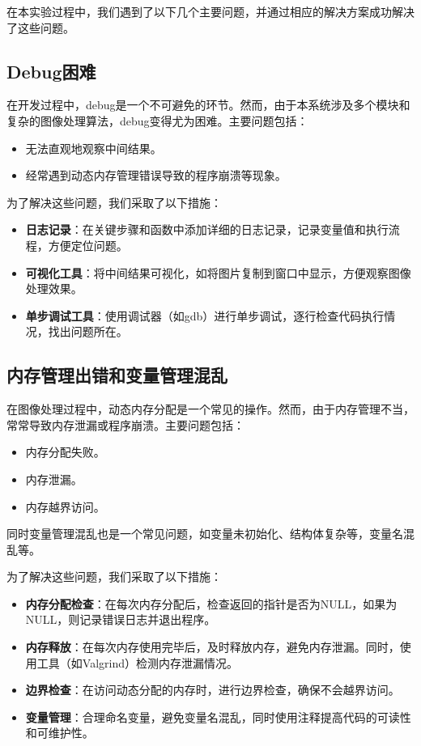 \documentclass[12pt,hyperref,a4paper,UTF8]{ctexart}
\begin{document}
在本实验过程中，我们遇到了以下几个主要问题，并通过相应的解决方案成功解决了这些问题。

\subsection{Debug困难}

在开发过程中，debug是一个不可避免的环节。然而，由于本系统涉及多个模块和复杂的图像处理算法，debug变得尤为困难。主要问题包括：
\begin{itemize}
    \item 无法直观地观察中间结果。
    \item 经常遇到动态内存管理错误导致的程序崩溃等现象。
\end{itemize}

为了解决这些问题，我们采取了以下措施：
\begin{itemize}
    \item \textbf{日志记录}：在关键步骤和函数中添加详细的日志记录，记录变量值和执行流程，方便定位问题。
    \item \textbf{可视化工具}：将中间结果可视化，如将图片复制到窗口中显示，方便观察图像处理效果。
    \item \textbf{单步调试工具}：使用调试器（如gdb）进行单步调试，逐行检查代码执行情况，找出问题所在。
\end{itemize}

\subsection{内存管理出错和变量管理混乱}

在图像处理过程中，动态内存分配是一个常见的操作。然而，由于内存管理不当，常常导致内存泄漏或程序崩溃。主要问题包括：
\begin{itemize}
    \item 内存分配失败。
    \item 内存泄漏。
    \item 内存越界访问。
\end{itemize}

同时变量管理混乱也是一个常见问题，如变量未初始化、结构体复杂等，变量名混乱等。

为了解决这些问题，我们采取了以下措施：
\begin{itemize}
    \item \textbf{内存分配检查}：在每次内存分配后，检查返回的指针是否为NULL，如果为NULL，则记录错误日志并退出程序。
    \item \textbf{内存释放}：在每次内存使用完毕后，及时释放内存，避免内存泄漏。同时，使用工具（如Valgrind）检测内存泄漏情况。
    \item \textbf{边界检查}：在访问动态分配的内存时，进行边界检查，确保不会越界访问。
    \item \textbf{变量管理}：合理命名变量，避免变量名混乱，同时使用注释提高代码的可读性和可维护性。
\end{itemize}
\end{document}
